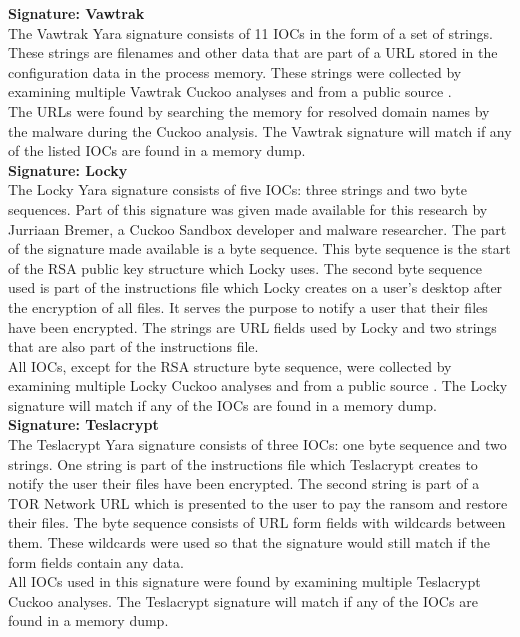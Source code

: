 \documentclass[conference]{IEEEtran}
\begin{document}
\textbf{Signature: Vawtrak}
\\The Vawtrak Yara signature consists of 11 \Gls{IOC}s in the form of a set of strings. These strings are filenames and other data that are part of a URL stored in the \Gls{configuration data} in the process memory. These strings were collected by examining multiple Vawtrak Cuckoo analyses and from a public source \cite{vawtrak-ioc}.\\The URLs were found by searching the memory for resolved domain names by the malware during the Cuckoo analysis. The Vawtrak signature will match if any of the listed \Gls{IOC}s are found in a memory dump.\\

\textbf{Signature: Locky}
\\The Locky Yara signature consists of five \Gls{IOC}s: three strings and two byte sequences. Part of this signature was given made available for this research by Jurriaan Bremer, a Cuckoo Sandbox developer and malware researcher. The part of the signature made available is a byte sequence. This byte sequence is the start of the RSA public key structure which Locky uses. The second byte sequence used is part of the instructions file which Locky creates on a user's desktop after the encryption of all files. It serves the purpose to notify a user that their files have been encrypted. The strings are URL fields used by Locky and two strings that are also part of the instructions file.\\All \Gls{IOC}s, except for the RSA structure byte sequence, were collected by examining multiple Locky Cuckoo analyses and from a public source \cite{nelson-locky}. The Locky signature will match if any of the \Gls{IOC}s are found in a memory dump.\\

\textbf{Signature: Teslacrypt}
\\The Teslacrypt Yara signature consists of three \Gls{IOC}s: one byte sequence and two strings. One string is part of the instructions file which Teslacrypt creates to notify the user their files have been encrypted. The second string is part of a TOR Network URL which is presented to the user to pay the ransom and restore their files. The byte sequence consists of URL form fields with wildcards between them. These wildcards were used so that the signature would still match if the form fields contain any data.\\All \Gls{IOC}s used in this signature were found by examining multiple Teslacrypt Cuckoo analyses. The Teslacrypt signature will match if any of the \Gls{IOC}s are found in a memory dump.\\
\end{document}
